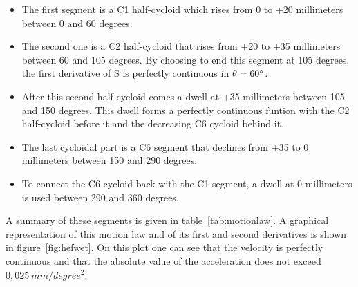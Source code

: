 \documentclass[a4paper]{article}
\begin{document}
\begin{itemize}

\item The first segment is a C1 half-cycloid which rises from 0 to +20 millimeters between 0 and 60 degrees. 

\item The second one is a C2 half-cycloid that rises from +20 to +35 millimeters between 60 and 105 degrees. By choosing to end this segment at 105 degrees, the first derivative of S is perfectly continuous in \(\theta=60\degree\).

\item After this second half-cycloid comes a dwell at +35 millimeters between 105 and 150 degrees. This dwell forms a perfectly continuous funtion with the C2 half-cycloid before it and the decreasing C6 cycloid behind it.

\item The last cycloidal part is a C6 segment that declines from +35 to 0 millimeters between 150 and 290 degrees.

\item To connect the C6 cycloid back with the C1 segment, a dwell at 0 millimeters is used between 290 and 360 degrees.

\end{itemize}

A summary of these segments is given in table~\ref{tab:motionlaw}. A graphical representation of this motion law and of its first and second derivatives is shown in figure~\ref{fig:hefwet}. On this plot one can see that the velocity is perfectly continuous and that the absolute value of the acceleration does not exceed \(0,025~\si{mm/degree^2}\).

\begin{table}[h]
	\centering
	\caption{Results of the use of the Kloomok and Muffley diagram for each segment with a lift \(L\neq0\).}
	\label{tab:nomogram}
\end{table}
\end{document}
